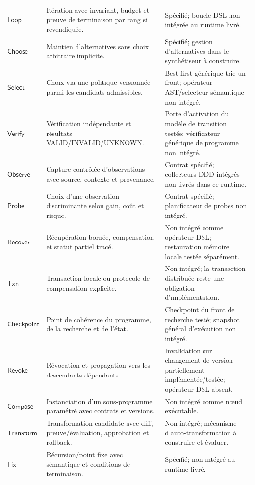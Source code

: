 \begin{longtable}{p{}p{}p{}}
\(\mathsf{Loop}\) & Itération avec invariant, budget et preuve de terminaison par rang si revendiquée. & Spécifié; boucle DSL non intégrée au runtime livré. \\
\(\mathsf{Choose}\) & Maintien d'alternatives sans choix arbitraire implicite. & Spécifié; gestion d'alternatives dans le synthétiseur à construire. \\
\(\mathsf{Select}\) & Choix via une politique versionnée parmi les candidats admissibles. & Best-first générique trie un front; opérateur AST/selecteur sémantique non intégré. \\
\(\mathsf{Verify}\) & Vérification indépendante et résultats VALID/INVALID/UNKNOWN. & Porte d'activation du modèle de transition testée; vérificateur générique de programme non intégré. \\
\(\mathsf{Observe}\) & Capture contrôlée d'observations avec source, contexte et provenance. & Contrat spécifié; collecteurs DDD intégrés non livrés dans ce runtime. \\
\(\mathsf{Probe}\) & Choix d'une observation discriminante selon gain, coût et risque. & Contrat spécifié; planificateur de probes non intégré. \\
\(\mathsf{Recover}\) & Récupération bornée, compensation et statut partiel tracé. & Non intégré comme opérateur DSL; restauration mémoire locale testée séparément. \\
\(\mathsf{Txn}\) & Transaction locale ou protocole de compensation explicite. & Non intégré; la transaction distribuée reste une obligation d'implémentation. \\
\(\mathsf{Checkpoint}\) & Point de cohérence du programme, de la recherche et de l'état. & Checkpoint du front de recherche testé; snapshot général d'exécution non intégré. \\
\(\mathsf{Revoke}\) & Révocation et propagation vers les descendants dépendants. & Invalidation sur changement de version partiellement implémentée/testée; opérateur DSL absent. \\
\(\mathsf{Compose}\) & Instanciation d'un sous-programme paramétré avec contrats et versions. & Non intégré comme nœud exécutable. \\
\(\mathsf{Transform}\) & Transformation candidate avec diff, preuve/évaluation, approbation et rollback. & Non intégré; mécanisme d'auto-transformation à construire et évaluer. \\
\(\mathsf{Fix}\) & Récursion/point fixe avec sémantique et conditions de terminaison. & Spécifié; non intégré au runtime livré. \\

\end{longtable}
